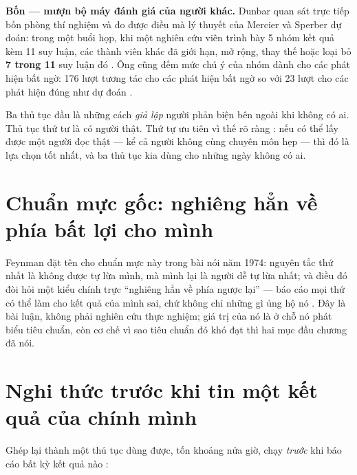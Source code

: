 \documentclass[../hieu-suat.tex]{subfiles}
\begin{document}
\textbf{Bốn --- mượn bộ máy đánh giá của người khác.} Dunbar \cite{dunbar1997} quan sát trực tiếp bốn phòng thí nghiệm và đo được điều mà lý thuyết của Mercier và Sperber dự đoán: trong một buổi họp, khi một nghiên cứu viên trình bày 5 nhóm kết quả kèm 11 suy luận, các thành viên khác đã giới hạn, mở rộng, thay thế hoặc loại bỏ \textbf{7 trong 11} suy luận đó \nD{}. Ông cũng đếm mức chú ý của nhóm dành cho các phát hiện bất ngờ: 176 lượt tương tác cho các phát hiện bất ngờ so với 23 lượt cho các phát hiện đúng như dự đoán \nD{}.

\begin{trucgiac}
Ba thủ tục đầu là những cách \emph{giả lập} người phản biện bên ngoài khi không có ai. Thủ tục thứ tư là có người thật. Thứ tự ưu tiên vì thế rõ ràng \nM{}: nếu có thể lấy được một người đọc thật --- kể cả người không cùng chuyên môn hẹp --- thì đó là lựa chọn tốt nhất, và ba thủ tục kia dùng cho những ngày không có ai.
\end{trucgiac}

\section{Chuẩn mực gốc: nghiêng hẳn về phía bất lợi cho mình}

Feynman \cite{feynman1974} đặt tên cho chuẩn mực này trong bài nói năm 1974: nguyên tắc thứ nhất là không được tự lừa mình, mà mình lại là người dễ tự lừa nhất; và điều đó đòi hỏi một kiểu chính trực ``nghiêng hẳn về phía ngược lại'' --- báo cáo mọi thứ có thể làm cho kết quả của mình sai, chứ không chỉ những gì ủng hộ nó \nT{}. Đây là bài luận, không phải nghiên cứu thực nghiệm; giá trị của nó là ở chỗ nó phát biểu tiêu chuẩn, còn cơ chế vì sao tiêu chuẩn đó khó đạt thì hai mục đầu chương đã nói.

\section{Nghi thức trước khi tin một kết quả của chính mình}

Ghép lại thành một thủ tục dùng được, tốn khoảng nửa giờ, chạy \emph{trước} khi báo cáo bất kỳ kết quả nào \nM{}:
\end{document}
